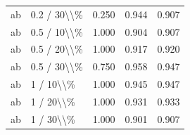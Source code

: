 \begin{table}[!h]
\begin{tabular}[t]{llccc}
\addlinespace
ab & 0.2 / 30\textbackslash{}\textbackslash{}\% & 0.250 & 0.944 & 0.907\\
ab & 0.5 / 10\textbackslash{}\textbackslash{}\% & 1.000 & 0.904 & 0.907\\
ab & 0.5 / 20\textbackslash{}\textbackslash{}\% & 1.000 & 0.917 & 0.920\\
ab & 0.5 / 30\textbackslash{}\textbackslash{}\% & 0.750 & 0.958 & 0.947\\
ab & 1 / 10\textbackslash{}\textbackslash{}\% & 1.000 & 0.945 & 0.947\\
\addlinespace
ab & 1 / 20\textbackslash{}\textbackslash{}\% & 1.000 & 0.931 & 0.933\\
ab & 1 / 30\textbackslash{}\textbackslash{}\% & 1.000 & 0.901 & 0.907\\
\bottomrule
\end{tabular}
\end{table}
